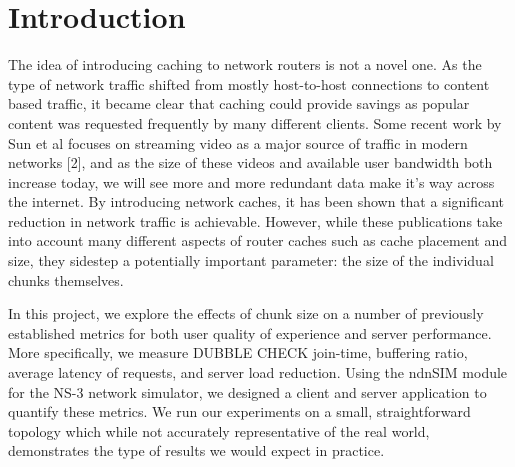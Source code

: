 \section{Introduction} \label{sec:Intro}

The idea of introducing caching to network routers is not a novel one. As the
type of network traffic shifted from mostly host-to-host connections to content
based traffic, it became clear that caching could provide savings as popular
content was requested frequently by many different clients. Some recent work by
Sun et al focuses on streaming video as a major source of traffic in modern
networks [2], and as the size of these videos and available user bandwidth both
increase today, we will see more and more redundant data make it’s way across
the internet. By introducing network caches, it has been shown that a
significant reduction in network traffic is achievable. However, while these
publications take into account many different aspects of router caches such as
cache placement and size, they sidestep a potentially important parameter: the
size of the individual chunks themselves. 

In this project, we explore the effects of chunk size on a number of previously
established metrics for both user quality of experience and server performance.
More specifically, we measure DUBBLE CHECK {join-time, buffering ratio, average
latency of requests, and server load reduction}. Using the ndnSIM module for the
NS-3 network simulator, we designed a client and server application to quantify
these metrics. We run our experiments on a small, straightforward topology which
while not accurately representative of the real world, demonstrates the type of
results we would expect in practice. 

